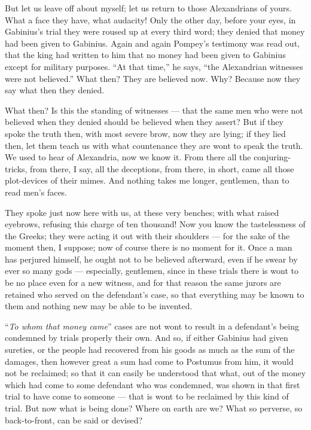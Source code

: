  But let us leave off about myself; let us return to those Alexandrians of yours. What a face they have, what audacity! Only the other day, before your eyes, in Gabinius's trial they were roused up at every third word; they denied that money had been given to Gabinius. Again and again Pompey's testimony was read out, that the king had written to him that no money had been given to Gabinius except for military purposes. ``At that time,'' he says, ``the Alexandrian witnesses were not believed.'' What then? They are believed now. Why? Because now they say what then they denied.

 What then? Is this the standing of witnesses --- that the same men who were not believed when they denied should be believed when they assert? But if they spoke the truth then, with most severe brow, now they are lying; if they lied then, let them teach us with what countenance they are wont to speak the truth. We used to hear of Alexandria, now we know it. From there all the conjuring-tricks, from there, I say, all the deceptions, from there, in short, came all those plot-devices of their mimes. And nothing takes me longer, gentlemen, than to read men's faces.

 They spoke just now here with us, at these very benches; with what raised eyebrows, refusing this charge of ten thousand! Now you know the tastelessness of the Greeks; they were acting it out with their shoulders --- for the sake of the moment then, I suppose; now of course there is no moment for it. Once a man has perjured himself, he ought not to be believed afterward, even if he swear by ever so many gods --- especially, gentlemen, since in these trials there is wont to be no place even for a new witness, and for that reason the same jurors are retained who served on the defendant's case, so that everything may be known to them and nothing new may be able to be invented.

 ``\textit{To whom that money came}'' cases are not wont to result in a defendant's being condemned by trials properly their own. And so, if either Gabinius had given sureties, or the people had recovered from his goods as much as the sum of the damages, then however great a sum had come to Postumus from him, it would not be reclaimed; so that it can easily be understood that what, out of the money which had come to some defendant who was condemned, was shown in that first trial to have come to someone --- that is wont to be reclaimed by this kind of trial. But now what is being done? Where on earth are we? What so perverse, so back-to-front, can be said or devised?


